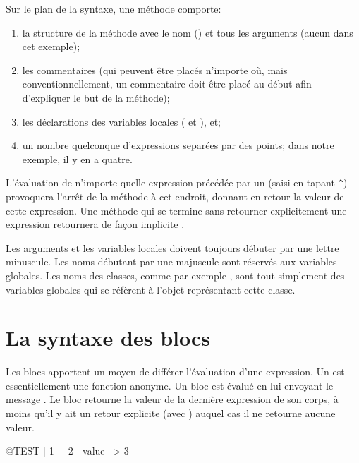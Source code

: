 \documentclass[a4paper,10pt,twoside]{book}
\begin{document}
Sur le plan de la syntaxe, une m\'{e}thode comporte:
\begin{enumerate}
  \item la structure de la m\'{e}thode avec le nom (\ie {}) et tous les arguments (aucun dans cet exemple);
  \item les commentaires (qui peuvent \^{e}tre plac\'{e}s n'importe
    o\`{u}, mais conventionnellement, un commentaire doit \^{e}tre plac\'{e} au d\'{e}but afin d'expliquer le but de la m\'{e}thode);
  \item les d\'{e}clarations des variables locales (\ie {} et
    ), et; 
  \item un nombre quelconque d'expressions separ\'{e}es par des points; dans notre exemple, il y en a quatre.
\end{enumerate}

L'\'{e}valuation de n'importe quelle expression pr\'{e}c\'{e}d\'{e}e
par un \ct{^} (saisi en tapant \verb|^|) provoquera l'arr\^{e}t de la m\'{e}thode \`{a} cet endroit, donnant en retour la valeur de cette expression.
Une m\'{e}thode qui se termine sans retourner explicitement une expression retournera de fa\c{c}on implicite .


Les arguments et les variables locales doivent toujours d\'{e}buter par une lettre minuscule.
Les noms d\'{e}butant par une majuscule sont r\'{e}servés aux variables globales.
Les noms des classes, comme par exemple , sont tout
simplement des variables globales qui se réfèrent à l'objet repr\'{e}sentant cette classe.

\section{La syntaxe des blocs}

Les blocs apportent un moyen de diff\'{e}rer l'\'{e}valuation d'une expression.
Un  est essentiellement une fonction anonyme. Un bloc est \'{e}valu\'{e} en lui envoyant le message .
Le bloc retourne la valeur de la derni\`{e}re expression de son corps,
\`{a} moins qu'il y ait un retour explicite (avec \ct{^}) auquel cas il ne retourne aucune valeur.

\begin{code}{@TEST}
[ 1 + 2 ] value --> 3
\end{code}
\end{document}
